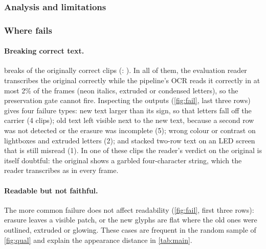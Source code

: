 \subsubsection{Analysis and limitations}
\label{sec:analysis}



\subsubsection{Where \method fails}
\label{sec:failures}
\paragraph{Breaking correct text.} \method breaks \rOursBroken{} of the \rOrigCorrect{} originally correct clips (\steer: \rSteerBroken). In all of them, the evaluation reader transcribes the original correctly while the pipeline's OCR reads it correctly in at most 2\% of the frames (neon italics, extruded or condensed letters), so the preservation gate cannot fire. Inspecting the outputs (\cref{fig:fail}, last three rows) gives four failure types: new text larger than its sign, so that letters fall off the carrier (4 clips); old text left visible next to the new text, because a second row was not detected or the erasure was incomplete (5); wrong colour or contrast on lightboxes and extruded letters (2); and stacked two-row text on an LED screen that is still misread (1). In one of these clips the reader's verdict on the original is itself doubtful: the original shows a garbled four-character string, which the reader transcribes as  in every frame.

\paragraph{Readable but not faithful.} The more common failure does not affect readability (\cref{fig:fail}, first three rows): erasure leaves a visible patch, or the new glyphs are flat where the old ones were outlined, extruded or glowing. These cases are frequent in the random sample of \cref{fig:qual} and explain the appearance distance in \cref{tab:main}.

